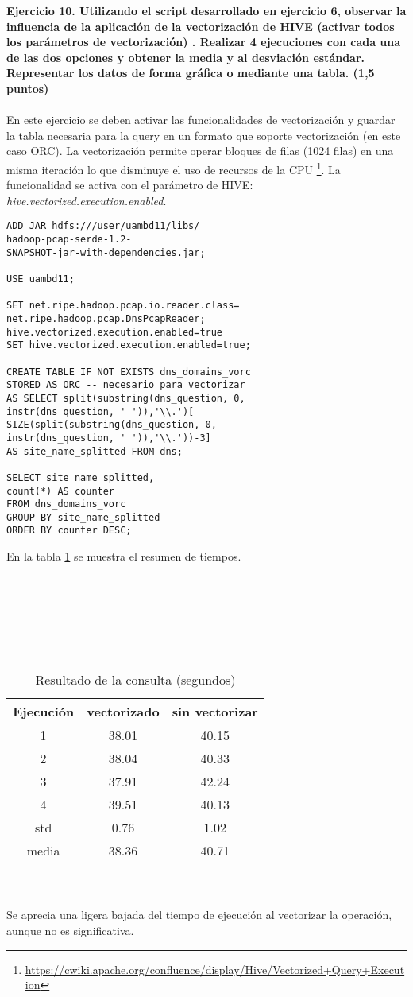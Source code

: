 \textbf{Ejercicio 10. Utilizando el script desarrollado en ejercicio 6, observar la influencia de la aplicación de la
	vectorización de HIVE (activar todos los parámetros de vectorización) . Realizar 4 ejecuciones
	con cada una de las dos opciones y obtener la media y al desviación estándar. Representar los
	datos de forma gráfica o mediante una tabla. (1,5 puntos)}\\\\
En este ejercicio se deben activar las funcionalidades de vectorización y guardar la tabla necesaria para la query en un formato que soporte vectorización (en este caso ORC). La vectorización permite operar bloques de filas (1024 filas) en una misma iteración lo que disminuye el uso de recursos de la CPU \footnote{\url{https://cwiki.apache.org/confluence/display/Hive/Vectorized+Query+Execution}}. La funcionalidad se activa con el parámetro de HIVE: \textit{hive.vectorized.execution.enabled}.
\begin{lstlisting}[caption=Consulta para obtener el ranking de dominios]
ADD JAR hdfs:///user/uambd11/libs/
hadoop-pcap-serde-1.2-
SNAPSHOT-jar-with-dependencies.jar;

USE uambd11;

SET net.ripe.hadoop.pcap.io.reader.class=
net.ripe.hadoop.pcap.DnsPcapReader;
hive.vectorized.execution.enabled=true 
SET hive.vectorized.execution.enabled=true; 

CREATE TABLE IF NOT EXISTS dns_domains_vorc
STORED AS ORC -- necesario para vectorizar
AS SELECT split(substring(dns_question, 0,
instr(dns_question, ' ')),'\\.')[
SIZE(split(substring(dns_question, 0,
instr(dns_question, ' ')),'\\.'))-3] 
AS site_name_splitted FROM dns;

SELECT site_name_splitted,
count(*) AS counter 
FROM dns_domains_vorc
GROUP BY site_name_splitted 
ORDER BY counter DESC;
\end{lstlisting}
En la tabla \ref{tab:c10} se muestra el resumen de tiempos.\\\\\\\\\\\\\\
\begin{table}[h!]
	\centering
	\caption{Resultado de la consulta (segundos)}
	\begin{tabular}[t]{ccc}
		Ejecución & vectorizado& sin vectorizar\\
		\hline
		
		1&38.01&	40.15\\
		2&38.04&	40.33\\
		3&37.91&	42.24\\
		4&39.51&	40.13\\
		\hline
		std &0.76&	1.02
		\\
		media &38.36 & 40.71
		
	\end{tabular}
	\label{tab:c10}
\end{table}%
\\\\
Se aprecia una ligera bajada del tiempo de ejecución al vectorizar la operación, aunque no es significativa.